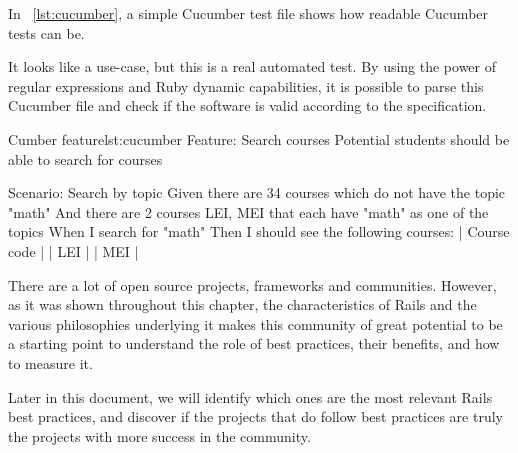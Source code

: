 In ~\ref{lst:cucumber}, a simple Cucumber test file shows how readable Cucumber tests can be.

It looks like a use-case, but this is a real automated test. 
By using the power of regular expressions and Ruby dynamic capabilities,
it is possible to parse this Cucumber file and check if the software is valid according to the specification. 

\begin{rubycode}{Cumber feature}{lst:cucumber}
Feature: Search courses
  Potential students should be able to search for courses

  Scenario: Search by topic
    Given there are 34 courses which do not have the topic "math"
    And there are 2 courses LEI, MEI that each have "math" as one of the topics
    When I search for "math"
    Then I should see the following courses:
      | Course code |
      | LEI         |
      | MEI         |
\end{rubycode}

There are a lot of open source projects, frameworks and communities. 
However, as it was shown throughout this chapter, the characteristics of Rails and the various philosophies underlying it
makes this community of great potential to be a starting point to understand the role of best practices, 
their benefits, and how to measure it. 

Later in this document, we will identify which ones are the most relevant Rails best practices,
and discover if the projects that do follow best practices are truly the projects with more success in the community.

